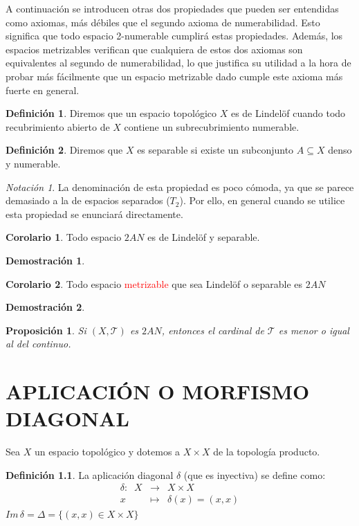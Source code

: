 \documentclass[12pt,twoside]{report}
\newcommand\mc[1]{\mathcal{#1}}
\theoremstyle{azul}
\theoremstyle{azul2}
\theoremstyle{plain}
\newtheorem*{prop}{Proposición}
\theoremstyle{definition}
\newtheorem*{defi}{Definición}
\newtheorem*{dem}{Demostración}
\newtheorem*{cor}{Corolario}
\theoremstyle{remark}
\newtheorem*{nota}{Notación}
\begin{document}
A continuación se introducen otras dos propiedades que pueden ser entendidas como axiomas, más débiles que el segundo axioma de numerabilidad. Esto significa que todo espacio 2-numerable cumplirá estas propiedades. Además, los espacios metrizables verifican que cualquiera de estos dos axiomas son equivalentes al segundo de numerabilidad, lo que justifica su utilidad a la hora de probar más fácilmente que un espacio metrizable dado cumple este axioma más fuerte en general.

\begin{defi}
Diremos que un espacio topológico $X$ es de Lindelöf cuando todo recubrimiento abierto de $X$ contiene un subrecubrimiento numerable.
\end{defi}

\begin{defi}
Diremos que $X$ es separable si existe un subconjunto $A \subseteq X$ denso y numerable.
\end{defi} 
\begin{nota}
La denominación de esta propiedad es poco cómoda, ya que se parece demasiado a la de espacios separados ($T_2$). Por ello, en general cuando se utilice esta propiedad se enunciará directamente.
\end{nota}

\begin{cor}
Todo espacio $2AN$ es de Lindelöf y separable.
\end{cor}
\begin{dem}

\end{dem}

\begin{cor}
Todo espacio \textcolor{red}{metrizable} que sea Lindelöf o separable es $2AN$
\end{cor}
\begin{dem}

\end{dem}

\begin{prop}
Si $(X,\mc{T})$ es $2AN$, entonces el cardinal de $\mc{T}$ es menor o igual al del continuo.
\end{prop}

\chapter{APLICACIÓN O MORFISMO DIAGONAL}
Sea $X$ un espacio topológico y dotemos a $X \times X$ de la topología producto.
\begin{defi}
La aplicación diagonal $\delta$ (que es inyectiva) se define como:
\vspace{3mm} $$ \begin{array}{rcl}
   \delta :\;\;  X & \longrightarrow  & X \times X  \\
     x & \longmapsto & \delta (x) = (x,x)
\end{array}$$
$Im\,\delta = \Delta = \{(x,x) \in X \times X\}$
\end{defi}
\end{document}

